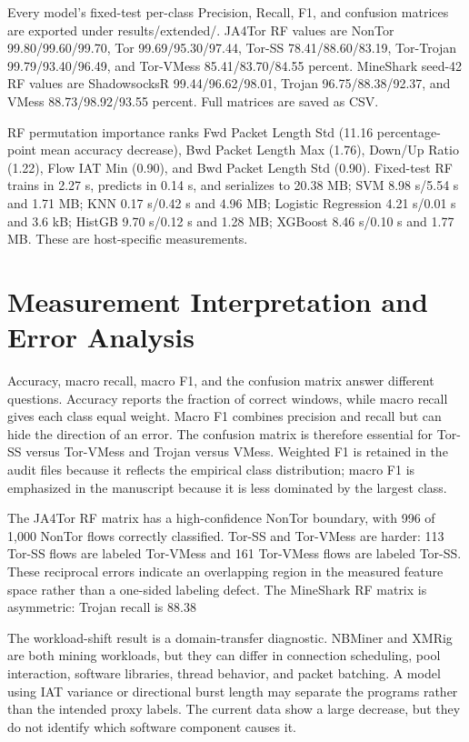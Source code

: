 \documentclass[conference]{IEEEtran}
\begin{document}
Every model's fixed-test per-class Precision, Recall, F1, and confusion matrices are exported under results/extended/. JA4Tor RF values are NonTor 99.80/99.60/99.70, Tor 99.69/95.30/97.44, Tor-SS 78.41/88.60/83.19, Tor-Trojan 99.79/93.40/96.49, and Tor-VMess 85.41/83.70/84.55 percent. MineShark seed-42 RF values are ShadowsocksR 99.44/96.62/98.01, Trojan 96.75/88.38/92.37, and VMess 88.73/98.92/93.55 percent. Full matrices are saved as CSV.

RF permutation importance ranks Fwd Packet Length Std (11.16 percentage-point mean accuracy decrease), Bwd Packet Length Max (1.76), Down/Up Ratio (1.22), Flow IAT Min (0.90), and Bwd Packet Length Std (0.90). Fixed-test RF trains in 2.27 s, predicts in 0.14 s, and serializes to 20.38 MB; SVM 8.98 s/5.54 s and 1.71 MB; KNN 0.17 s/0.42 s and 4.96 MB; Logistic Regression 4.21 s/0.01 s and 3.6 kB; HistGB 9.70 s/0.12 s and 1.28 MB; XGBoost 8.46 s/0.10 s and 1.77 MB. These are host-specific measurements.
\section{Measurement Interpretation and Error Analysis}
Accuracy, macro recall, macro F1, and the confusion matrix answer different questions. Accuracy reports the fraction of correct windows, while macro recall gives each class equal weight. Macro F1 combines precision and recall but can hide the direction of an error. The confusion matrix is therefore essential for Tor-SS versus Tor-VMess and Trojan versus VMess. Weighted F1 is retained in the audit files because it reflects the empirical class distribution; macro F1 is emphasized in the manuscript because it is less dominated by the largest class.

The JA4Tor RF matrix has a high-confidence NonTor boundary, with 996 of 1,000 NonTor flows correctly classified. Tor-SS and Tor-VMess are harder: 113 Tor-SS flows are labeled Tor-VMess and 161 Tor-VMess flows are labeled Tor-SS. These reciprocal errors indicate an overlapping region in the measured feature space rather than a one-sided labeling defect. The MineShark RF matrix is asymmetric: Trojan recall is 88.38%

The workload-shift result is a domain-transfer diagnostic. NBMiner and XMRig are both mining workloads, but they can differ in connection scheduling, pool interaction, software libraries, thread behavior, and packet batching. A model using IAT variance or directional burst length may separate the programs rather than the intended proxy labels. The current data show a large decrease, but they do not identify which software component causes it.
\end{document}
